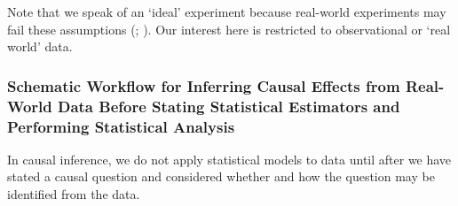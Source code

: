 \documentclass[
  single column]{article}
\begin{document}
Note that we speak of an `ideal' experiment because real-world
experiments may fail these assumptions
(;
). Our interest
here is restricted to observational or `real world' data.

\subsubsection{Schematic Workflow for Inferring Causal Effects from
Real-World Data Before Stating Statistical Estimators and Performing
Statistical
Analysis}\label{schematic-workflow-for-inferring-causal-effects-from-real-world-data-before-stating-statistical-estimators-and-performing-statistical-analysis}

In causal inference, we do not apply statistical models to data until
after we have stated a causal question and considered whether and how
the question may be identified from the data.
\end{document}
